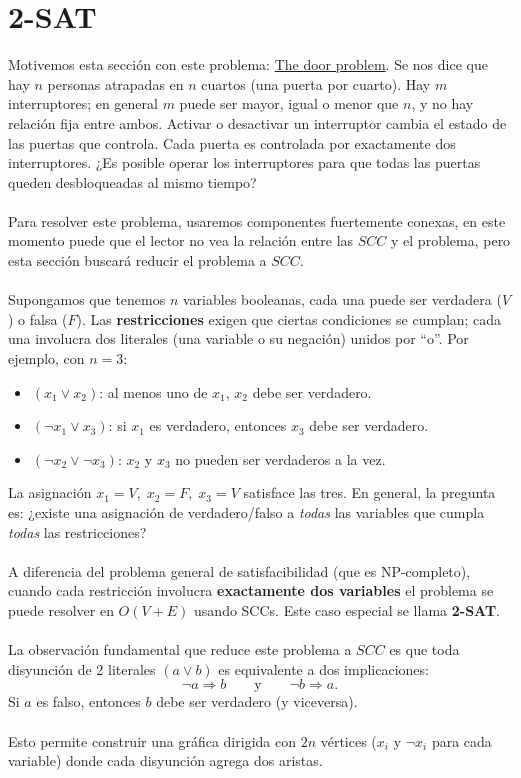 \section{2-SAT\adv}
Motivemos esta sección con este problema: \href{https://codeforces.com/problemset/problem/776/D}{The door problem}. Se nos dice que hay $n$ personas atrapadas en $n$ cuartos (una puerta por cuarto). Hay $m$ interruptores; en general $m$ puede ser mayor, igual o menor que $n$, y no hay relación fija entre ambos. Activar o desactivar un interruptor cambia el estado de las puertas que controla. Cada puerta es controlada por exactamente dos interruptores. ¿Es posible operar los
interruptores para que todas las puertas queden desbloqueadas al mismo
tiempo?
\\\\
Para resolver este problema, usaremos componentes fuertemente conexas, en este momento puede que el lector no vea la relación entre las $SCC$ y el problema, pero esta sección buscará reducir el problema a $SCC$.
\\\\
Supongamos que tenemos $n$ variables booleanas, cada una puede ser verdadera ($V$) o falsa ($F$). Las \textbf{restricciones} exigen que ciertas condiciones se cumplan; cada una involucra dos literales (una variable o su negación) unidos por ``o''. Por ejemplo, con $n = 3$:
\begin{itemize}
    \item $(x_1 \lor x_2)$: al menos uno de $x_1$, $x_2$ debe ser verdadero.
    \item $(\neg x_1 \lor x_3)$: si $x_1$ es verdadero, entonces $x_3$ debe ser verdadero.
    \item $(\neg x_2 \lor \neg x_3)$: $x_2$ y $x_3$ no pueden ser verdaderos a la vez.
\end{itemize}
La asignación $x_1 = V,\; x_2 = F,\; x_3 = V$ satisface las tres. En general, la pregunta es: ¿existe una asignación de verdadero/falso a \emph{todas} las variables que cumpla \emph{todas} las restricciones?
\\\\
A diferencia del problema general de satisfacibilidad (que es
NP-completo), cuando cada restricción involucra \textbf{exactamente
dos variables} el problema se puede resolver en $O(V + E)$ usando SCCs.
Este caso especial se llama \textbf{2-SAT}.
\\\\
La observación fundamental que reduce este problema a $SCC$ es que toda disyunción de 2 literales $(a \lor b)$ es equivalente a dos implicaciones:
\[
\neg a \Rightarrow b \qquad \text{y} \qquad \neg b \Rightarrow a.
\]
Si $a$ es falso, entonces $b$ debe ser verdadero (y viceversa).
\\\\
Esto permite construir una gráfica dirigida con $2n$ vértices ($x_i$ y $\neg x_i$ para cada variable) donde cada disyunción agrega dos aristas.
 
